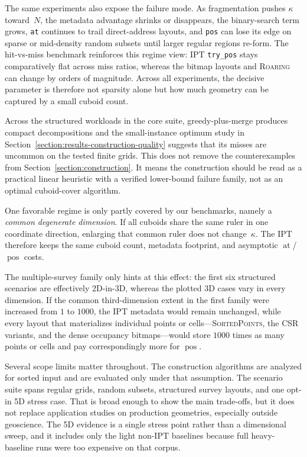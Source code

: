 \documentclass[manuscript,screen,review]{acmart}
\theoremstyle{definition}
\theoremstyle{plain}
\begin{document}
The same experiments also expose the failure mode. As fragmentation
pushes $\kappa$ toward~$N$, the metadata advantage shrinks or
disappears, the binary-search term grows, \texttt{at} continues to
trail direct-address layouts, and \texttt{pos} can lose its edge on
sparse or mid-density random subsets until larger regular regions
re-form. The hit-vs-miss benchmark reinforces this regime view: IPT
\texttt{try\_pos} stays comparatively flat across miss ratios, whereas
the bitmap layouts and \textsc{Roaring} can change by orders of
magnitude. Across all experiments, the decisive parameter is therefore
not sparsity alone but how much geometry can be captured by a small
cuboid count.

Across the structured workloads in the core suite, greedy-plus-merge
produces compact decompositions and the small-instance optimum study in
Section~\ref{section:results-construction-quality} suggests that its
misses are uncommon on the tested finite grids. This does not remove
the counterexamples from Section~\ref{section:construction}. It means
the construction should be read as a practical linear heuristic with a
verified lower-bound failure family, not as an optimal cuboid-cover
algorithm.

One favorable regime is only partly covered by our benchmarks, namely
a \emph{common degenerate dimension}. If all cuboids share the same
ruler in one coordinate direction, enlarging that common ruler does
not change~$\kappa$. The IPT therefore keeps the same cuboid count,
metadata footprint, and asymptotic $\operatorname{at}$/$\operatorname{pos}$ costs.

The multiple-survey family only hints at this effect: the first six
structured scenarios are effectively 2D-in-3D, whereas the plotted 3D
cases vary in every dimension. If the common third-dimension extent in
the first family were increased from $1$ to $1000$, the IPT metadata
would remain unchanged, while every layout that materializes individual
points or cells---\textsc{SortedPoints}, the CSR variants, and the
dense occupancy bitmaps---would store $1000$ times as many points or
cells and pay correspondingly more for $\operatorname{pos}$.

Several scope limits matter throughout. The construction algorithms are
analyzed for sorted input and are evaluated only under that assumption.
The scenario suite spans regular grids, random subsets, structured
survey layouts, and one opt-in 5D stress case. That is broad enough to
show the main trade-offs, but it does not replace application studies
on production geometries, especially outside geoscience. The 5D
evidence is a single stress point rather than a dimensional sweep, and
it includes only the light non-IPT baselines because full heavy-baseline
runs were too expensive on that corpus.
\end{document}
